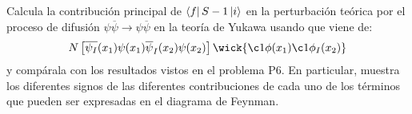 
\begin{ejercicio} 
	Calcula la contribución principal de $\bra{f}S-1\ket{i}$ en la perturbación teórica por el proceso de difusión $\psi\overline{\psi} \rightarrow \psi \overline{\psi}$ en la teoría de Yukawa usando que viene de:
	\begin{equation}
		N\ccorchetes{\overline{\psi_I}(x_1)\psi(x_1)\overline{\psi}_I(x_2)\psi(x_2)} \wick{\c1{\phi}(x_1) \c1{\phi_I}(x_2)} 
	\end{equation}
	y compárala con los resultados vistos en el problema P6. En particular, muestra los diferentes signos de las diferentes contribuciones de cada uno de los términos que pueden ser expresadas en el diagrama de Feynman.	
\end{ejercicio}


